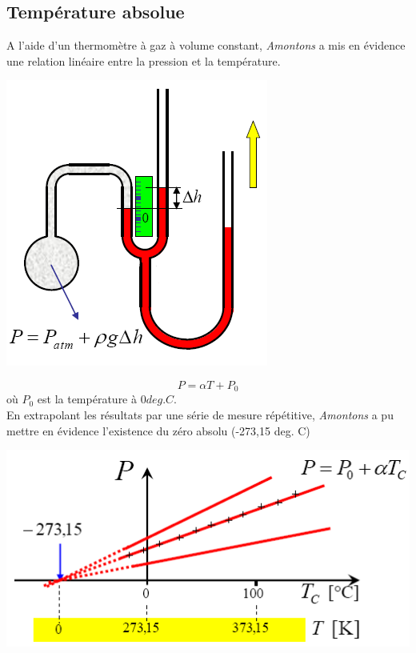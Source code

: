 \documentclass	[11pt, a4paper, openany]{book}
\begin{document}
\subsection{Température absolue}
A l'aide d'un thermomètre à gaz à volume constant, \textit{Amontons} a mis en évidence une relation linéaire entre la pression et la température.
\begin{center}
	\includegraphics[scale=0.15]{th/image3.png}
\end{center}
\begin{equation}
	P = \alpha T + P_0
\end{equation}
où $P_0$ est la température à $0 deg. C$.\\
En extrapolant les résultats par une série de mesure répétitive, \textit{Amontons} a pu mettre en évidence l'existence du zéro absolu (-273,15 deg. C)
\begin{center}
	\includegraphics[scale=0.3]{th/image4.png}
\end{center}
\end{document}

